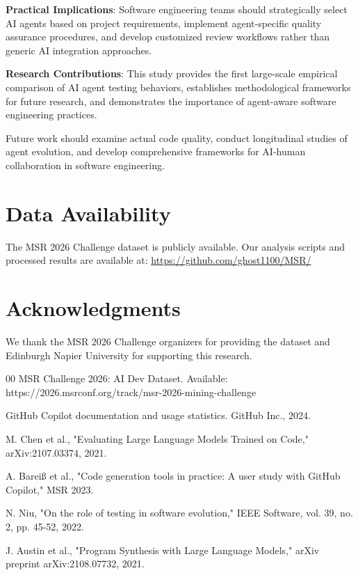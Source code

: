 \documentclass[conference]{IEEEtran}
\begin{document}
{{\textbf{Practical Implications}: Software engineering teams should strategically select AI agents based on project requirements, implement agent-specific quality assurance procedures, and develop customized review workflows rather than generic AI integration approaches.

\textbf{Research Contributions}: This study provides the first large-scale empirical comparison of AI agent testing behaviors, establishes methodological frameworks for future research, and demonstrates the importance of agent-aware software engineering practices.

Future work should examine actual code quality, conduct longitudinal studies of agent evolution, and develop comprehensive frameworks for AI-human collaboration in software engineering.

\section*{Data Availability}

The MSR 2026 Challenge dataset is publicly available. Our analysis scripts and processed results are available at: \url{https://github.com/ghost1100/MSR/}

\section*{Acknowledgments}

We thank the MSR 2026 Challenge organizers for providing the dataset and Edinburgh Napier University for supporting this research.

\balance
\begin{thebibliography}{00}
 MSR Challenge 2026: AI Dev Dataset. Available: https://2026.msrconf.org/track/msr-2026-mining-challenge

 GitHub Copilot documentation and usage statistics. GitHub Inc., 2024.

 M. Chen et al., "Evaluating Large Language Models Trained on Code," arXiv:2107.03374, 2021.

 A. Bareiß et al., "Code generation tools in practice: A user study with GitHub Copilot," MSR 2023.

 N. Niu, "On the role of testing in software evolution," IEEE Software, vol. 39, no. 2, pp. 45-52, 2022.

 J. Austin et al., "Program Synthesis with Large Language Models," arXiv preprint arXiv:2108.07732, 2021.


\end{thebibliography}}}
\end{document}
